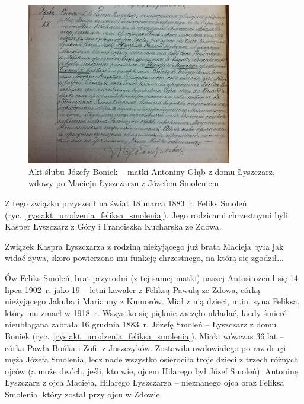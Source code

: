 \begin{figure}[!h]
\begin{center}
\includegraphics[width=0.8\textwidth]{zdjecia/akt_slubu_jozefy_boniek_i_jozefa_smolenia.jpg}
\caption[Akt ślubu Józefy Boniek z Józefem Smoleniem]{Akt ślubu Józefy Boniek -- matki Antoniny Głąb z domu Łyszczarz, wdowy po Macieju Łyszczarzu z Józefem Smoleniem}
\label{rys:akt_slubu_jozefy_boniek_i_jozefa_smolenia}
\end{center}
\end{figure}

Z tego związku przyszedł na świat 18 marca 1883~r. Feliks Smoleń (ryc.~\ref{rys:akt_urodzenia_feliksa_smolenia}). Jego rodzicami chrzestnymi byli Kasper Łyszczarz z Góry i Franciszka Kucharska ze Zdowa.

Związek Kaspra Łyszczarza z rodziną nieżyjącego już brata Macieja była jak widać żywa, skoro powierzono mu funkcję chrzestnego, na którą się zgodził...

Ów Feliks Smoleń, brat przyrodni (z tej samej matki) naszej Antosi ożenił się 14 lipca 1902~r. jako 19 – letni kawaler z Feliksą Pawulą ze Zdowa, córką nieżyjącego Jakuba i Marianny z Kumorów. Miał z nią dzieci, m.in. syna Feliksa, który mu zmarł w 1918~r.
Wszystko się pięknie zaczęło układać, kiedy śmierć nieubłagana zabrała 16 grudnia 1883~r. Józefę Smoleń -- Łyszczarz z domu Boniek (ryc.~\ref{rys:akt_urodzenia_feliksa_smolenia}). Miała wówczas 36 lat -- córka Pawła Bońka i Zofii z Juszczyków. Zostawiła owdowiałego po raz drugi męża Józefa Smolenia, lecz nade wszystko osierociła troje dzieci z  trzech różnych ojców (a może dwóch, jeśli, kto wie, ojcem Hilarego był Józef Smoleń): Antoninę Łyszczarz z ojca Macieja, Hilarego Łyszczarza – nieznanego ojca oraz Feliksa Smolenia, który został przy ojcu w Zdowie.

